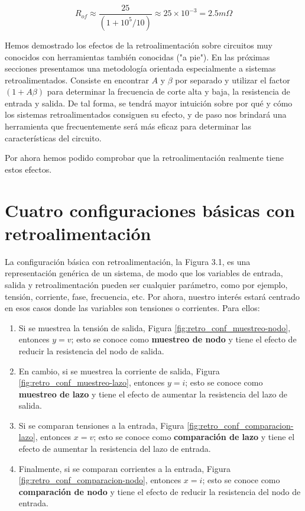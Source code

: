 \[
R_{of} \approx \frac{25}{(1 + 10^5 / 10)} \approx 25 \times 10^{-3} = 2.5 m\Omega
\]

Hemos demostrado los efectos de la retroalimentación sobre circuitos muy conocidos con herramientas también conocidas ("a pie").  
En las próximas secciones presentamos una metodología orientada especialmente a sistemas retroalimentados.  
Consiste en encontrar \( A \) y \( \beta \) por separado y utilizar el factor \( (1 + A\beta) \) para determinar la frecuencia de corte alta y baja, la resistencia de entrada y salida.  
De tal forma, se tendrá mayor intuición sobre por qué y cómo los sistemas retroalimentados consiguen su efecto, y de paso nos brindará una herramienta que frecuentemente será más eficaz para determinar las características del circuito.  

Por ahora hemos podido comprobar que la retroalimentación realmente tiene estos efectos.

\section{Cuatro configuraciones básicas con retroalimentación} %

La configuración básica con retroalimentación, la Figura 3.1, es una representación genérica de un sistema, de modo que los variables de entrada, salida y retroalimentación pueden ser cualquier parámetro, como por ejemplo, tensión, corriente, fase, frecuencia, etc. Por ahora, nuestro interés estará centrado en esos casos donde las variables son tensiones o corrientes. Para ellos:

\begin{enumerate}
	\item Si se muestrea la tensión de salida, Figura \ref{fig:retro_conf_muestreo-nodo}, entonces \( y = v \); esto se conoce como \textbf{muestreo de nodo} y tiene el efecto de reducir la resistencia del nodo de salida.
	\item En cambio, si se muestrea la corriente de salida, Figura \ref{fig:retro_conf_muestreo-lazo}, entonces \( y = i \); esto se conoce como \textbf{muestreo de lazo} y tiene el efecto de aumentar la resistencia del lazo de salida.
	\item Si se comparan tensiones a la entrada, Figura \ref{fig:retro_conf_comparacion-lazo}, entonces \( x = v \); esto se conoce como \textbf{comparación de lazo} y tiene el efecto de aumentar la resistencia del lazo de entrada.
	\item Finalmente, si se comparan corrientes a la entrada, Figura \ref{fig:retro_conf_comparacion-nodo}, entonces \( x = i \); esto se conoce como \textbf{comparación de nodo} y tiene el efecto de reducir la resistencia del nodo de entrada.
\end{enumerate}

